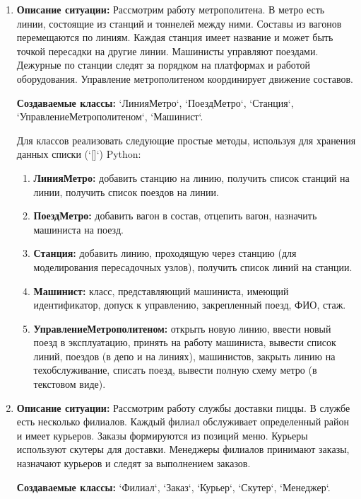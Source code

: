 \begin{enumerate}
\item
\textbf{Описание ситуации:}
Рассмотрим работу метрополитена. В метро есть линии, состоящие из станций и тоннелей между ними. Составы из вагонов перемещаются по линиям. Каждая станция имеет название и может быть точкой пересадки на другие линии. Машинисты управляют поездами. Дежурные по станции следят за порядком на платформах и работой оборудования. Управление метрополитеном координирует движение составов.

\textbf{Создаваемые классы:} `ЛинияМетро`, `ПоездМетро`, `Станция`, `УправлениеМетрополитеном`, `Машинист`.

Для классов реализовать следующие простые методы, используя для хранения данных списки (`[]`) Python:
\begin{enumerate}
    \item \textbf{ЛинияМетро:} добавить станцию на линию, получить список станций на линии, получить список поездов на линии.
    \item \textbf{ПоездМетро:} добавить вагон в состав, отцепить вагон, назначить машиниста на поезд.
    \item \textbf{Станция:} добавить линию, проходящую через станцию (для моделирования пересадочных узлов), получить список линий на станции.
    \item \textbf{Машинист:} класс, представляющий машиниста, имеющий идентификатор, допуск к управлению, закрепленный поезд, ФИО, стаж.
    \item \textbf{УправлениеМетрополитеном:} открыть новую линию, ввести новый поезд в эксплуатацию, принять на работу машиниста, вывести список линий, поездов (в депо и на линиях), машинистов, закрыть линию на техобслуживание, списать поезд, вывести полную схему метро (в текстовом виде).
\end{enumerate}

\item
\textbf{Описание ситуации:}
Рассмотрим работу службы доставки пиццы. В службе есть несколько филиалов. Каждый филиал обслуживает определенный район и имеет курьеров. Заказы формируются из позиций меню. Курьеры используют скутеры для доставки. Менеджеры филиалов принимают заказы, назначают курьеров и следят за выполнением заказов.

\textbf{Создаваемые классы:} `Филиал`, `Заказ`, `Курьер`, `Скутер`, `Менеджер`.


\end{enumerate}
